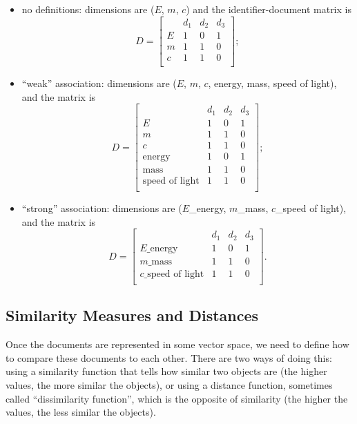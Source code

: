 \begin{itemize}\itemsep1pt\parskip0pt
  \item no definitions: dimensions are ($E$, $m$, $c$) and the identifier-document matrix is
  $$D = \left[
    \begin{array}{c|ccc}
       & d_1 & d_2 & d_3 \\
      \hline
      E & 1 & 0 & 1  \\
      m & 1 & 1 & 0 \\
      c & 1 & 1 & 0 \\
    \end{array}
  \right];$$
  \item ``weak'' association: dimensions are ($E$, $m$, $c$, energy, mass,
  speed of light), and the matrix is $$D = \left[
    \begin{array}{r|ccc}
       & d_1 & d_2 & d_3 \\
      \hline
      E                     & 1 & 0 & 1  \\
      m                     & 1 & 1 & 0 \\
      c                     & 1 & 1 & 0 \\
      \text{energy}         & 1 & 0 & 1  \\
      \text{mass}           & 1 & 1 & 0 \\
      \text{speed of light} & 1 & 1 & 0 \\
    \end{array}
  \right];$$
  \item ``strong'' association: dimensions are ($E$\_energy, $m$\_mass, $c$\_speed of light), and the matrix is $$D = \left[
    \begin{array}{r|ccc}
       & d_1 & d_2 & d_3 \\
      \hline
      E\text{\_energy} & 1 & 0 & 1  \\
      m\text{\_mass} & 1 & 1 & 0 \\
      c\text{\_speed of light} & 1 & 1 & 0 \\
    \end{array}
  \right].$$
\end{itemize}


\subsection{Similarity Measures and Distances} \label{sec:similarity-distance}

Once the documents are represented in some vector space, we need to
define how to compare these documents to each other. There are two
ways of doing this: using a similarity function that tells how similar
two objects are (the higher values, the more similar the objects),
or using a distance function, sometimes called ``dissimilarity function'',
which is the opposite of similarity (the higher the values, the less similar
the objects).

